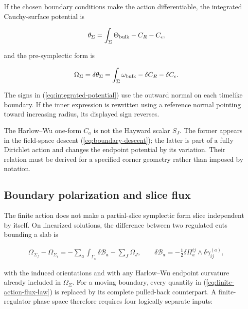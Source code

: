 If the chosen boundary conditions make the action differentiable, the integrated Cauchy-surface potential is

\begin{align}
\theta_\Sigma
=\int_\Sigma\Theta_{\rm bulk}
-C_R-C_\epsilon, \label{eq:integrated-potential}
\end{align}

and the pre-symplectic form is

\begin{align}
\Omega_\Sigma
=\delta\theta_\Sigma
=\int_\Sigma\omega_{\rm bulk}
-\delta C_R-\delta C_\epsilon . \label{eq:integrated-symplectic}
\end{align}

The signs in (\ref{eq:integrated-potential}) use the outward normal on each timelike boundary. If the inner expression is rewritten using a reference normal pointing toward increasing radius, its displayed sign reverses.

The Harlow--Wu one-form $C_a$ is not the Hayward scalar $S_J$. The former appears in the field-space descent (\ref{eq:boundary-descent}); the latter is part of a fully Dirichlet action and changes the endpoint potential by its variation. Their relation must be derived for a specified corner geometry rather than imposed by notation.

\subsection{Boundary polarization and slice flux}\label{subsec:boundary-polarization}

The finite action does not make a partial-slice symplectic form slice independent by itself. On linearized solutions, the difference between two regulated cuts bounding a slab is

\begin{align}
\Omega_{\Sigma_f}-\Omega_{\Sigma_i}
=-\sum_a\int_{\Gamma_a}\delta\mathcal B_a
-\sum_J\Omega_J,
\qquad
\delta\mathcal B_a
=-\frac12\delta\Pi_a^{ij}\wedge\delta\gamma^{(a)}_{ij},
\label{eq:finite-action-flux-law}
\end{align}

with the induced orientations and with any Harlow--Wu endpoint curvature already included in $\Omega_\Sigma$. For a moving boundary, every quantity in (\ref{eq:finite-action-flux-law}) is replaced by its complete pulled-back counterpart. A finite-regulator phase space therefore requires four logically separate inputs:


